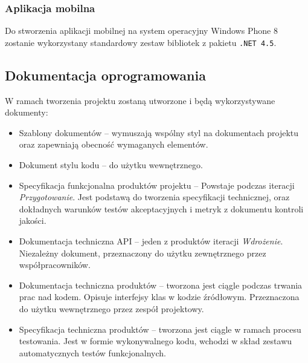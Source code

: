 \subsubsection{Aplikacja mobilna}
Do stworzenia aplikacji mobilnej na system operacyjny Windows Phone 8
zostanie wykorzystany standardowy zestaw bibliotek z pakietu \texttt{.NET 4.5}.

\subsection{Dokumentacja oprogramowania}
W ramach tworzenia projektu zostaną utworzone i będą wykorzystywane dokumenty:
\begin{itemize}
    \item Szablony dokumentów -- wymuszają wspólny styl na dokumentach projektu
        oraz zapewniają obecność wymaganych elementów.
    \item Dokument stylu kodu -- do użytku wewnętrznego.
    \item Specyfikacja funkcjonalna produktów projektu -- Powstaje podczas
        iteracji \emph{Przygotowanie}. Jest podstawą do tworzenia specyfikacji
        technicznej, oraz dokładnych warunków testów akceptacyjnych i metryk z
        dokumentu kontroli jakości.
    \item Dokumentacja techniczna API -- jeden z produktów iteracji
        \emph{Wdrożenie}. Niezależny dokument, przeznaczony do użytku
        zewnętrznego przez współpracowników.
    \item Dokumentacja techniczna produktów -- tworzona jest ciągle podczas
        trwania prac nad kodem. Opisuje interfejsy klas w kodzie źródłowym.
        Przeznaczona do użytku wewnętrznego przez zespół projektowy.
    \item Specyfikacja techniczna produktów -- tworzona jest ciągle w ramach
        procesu testowania. Jest w formie wykonywalnego kodu, wchodzi w skład
        zestawu automatycznych testów funkcjonalnych.
\end{itemize}
